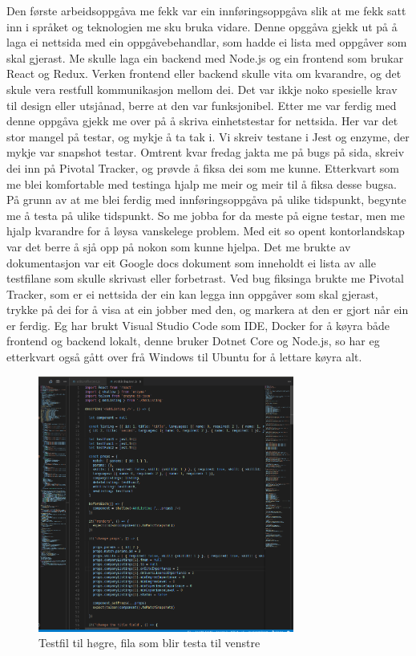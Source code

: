 \documentclass[12pt]{article}
\begin{document}
Den første arbeidsoppgåva me fekk var ein innføringsoppgåva slik at me fekk satt
inn i språket og teknologien me sku bruka vidare. Denne opggåva gjekk ut på å
laga ei nettsida med ein oppgåvebehandlar, som hadde ei lista med oppgåver som skal gjerast.
Me skulle laga ein backend med Node.js og ein frontend som brukar React og Redux.
Verken frontend eller backend skulle vita om kvarandre, og det skule vera restfull
kommunikasjon mellom dei. Det var ikkje noko spesielle krav til design eller utsjånad,
berre at den var funksjonibel. Etter me var ferdig med denne oppgåva gjekk me
over på å skriva einhetstestar for nettsida. Her var det stor mangel på
testar, og mykje å ta tak i. Vi skreiv testane i Jest og enzyme, der mykje var
snapshot testar. Omtrent kvar fredag jakta me på bugs på sida, skreiv dei inn på
Pivotal Tracker, og prøvde å fiksa dei som me kunne. Etterkvart som me blei
komfortable med testinga hjalp me meir og meir til å fiksa desse bugsa.
På grunn av at me blei ferdig med innføringsoppgåva på ulike tidspunkt, begynte
me å testa på ulike tidspunkt. So me jobba for da meste på eigne testar, men me
hjalp kvarandre for å løysa vanskelege problem. Med eit so opent kontorlandskap
var det berre å sjå opp på nokon som kunne hjelpa. Det me brukte av dokumentasjon
var eit Google docs dokument som inneholdt ei lista av alle testfilane som skulle
skrivast eller forbetrast. Ved bug fiksinga brukte me Pivotal Tracker, som er ei
nettsida der ein kan legga inn oppgåver som skal gjerast, trykke på dei for å visa
at ein jobber med den, og markera at den er gjort når ein er ferdig. Eg har brukt
Visual Studio Code som IDE, Docker for å køyra både frontend og backend lokalt,
denne bruker Dotnet Core og Node.js, so har eg etterkvart også gått over frå
Windows til Ubuntu for å lettare køyra alt.

\begin{figure}[!h]
  \includegraphics[width=0.75\textwidth]{test}
  \centering
  \caption{Testfil til høgre, fila som blir testa til venstre}
  \label{fig:test1}
\end{figure}
\end{document}
